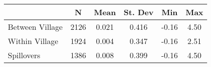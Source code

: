 \begin{tabular}{l*{5}{c}}\hline&\multicolumn{1}{c}{N}&\multicolumn{1}{c}{Mean}&\multicolumn{1}{c}{St. Dev}&\multicolumn{1}{c}{Min}&\multicolumn{1}{c}{Max}\\ \hline 
Between Village & 2126 & 0.021 & 0.416 & -0.16 & 4.50 \\
Within Village & 1924 & 0.004 & 0.347 & -0.16 & 2.51 \\
Spillovers & 1386 & 0.008 & 0.399 & -0.16 & 4.50 \\
\hline \end{tabular}
